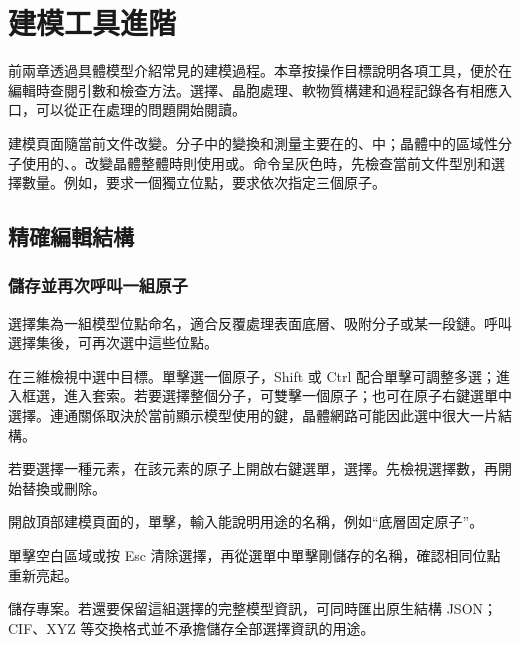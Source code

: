 \chapter{建模工具進階}\label{ch:modeling-tools}\label{sec:modeling-reference}

前兩章透過具體模型介紹常見的建模過程。本章按操作目標說明各項工具，便於在編輯時查閱引數和檢查方法。選擇、晶胞處理、軟物質構建和過程記錄各有相應入口，可以從正在處理的問題開始閱讀。

建模頁面隨當前文件改變。分子中的變換和測量主要在的、中；晶體中的區域性分子使用的、。改變晶體整體時則使用或。命令呈灰色時，先檢查當前文件型別和選擇數量。例如，要求一個獨立位點，要求依次指定三個原子。

\section{精確編輯結構}

\subsection{儲存並再次呼叫一組原子}\label{sec:selection-set-workflow}

選擇集為一組模型位點命名，適合反覆處理表面底層、吸附分子或某一段鏈。呼叫選擇集後，可再次選中這些位點。

\begin{steps}
  \item 在三維檢視中選中目標。單擊選一個原子，Shift 或 Ctrl 配合單擊可調整多選；進入框選，進入套索。若要選擇整個分子，可雙擊一個原子；也可在原子右鍵選單中選擇。連通關係取決於當前顯示模型使用的鍵，晶體網路可能因此選中很大一片結構。
  \item 若要選擇一種元素，在該元素的原子上開啟右鍵選單，選擇。先檢視選擇數，再開始替換或刪除。
  \item 開啟頂部建模頁面的，單擊，輸入能說明用途的名稱，例如“底層固定原子”。
  \item 單擊空白區域或按 Esc 清除選擇，再從選單中單擊剛儲存的名稱，確認相同位點重新亮起。
  \item 儲存專案。若還要保留這組選擇的完整模型資訊，可同時匯出原生結構 JSON；CIF、XYZ 等交換格式並不承擔儲存全部選擇資訊的用途。
\end{steps}

